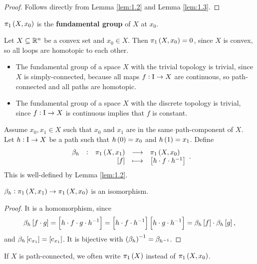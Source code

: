 \begin{proof}
Follows directly from Lemma \ref{lem:1.2} and Lemma \ref{lem:1.3}.
\end{proof}

\begin{definition*}
$ \pi_1\br{X, x_0} $ is the \textbf{fundamental group} of $ X $ at $ x_0 $.
\end{definition*}

\begin{example*}
Let $ X \subseteq \mathbb{R}^n $ be a convex set and $ x_0 \in X $. Then $ \pi_1\br{X, x_0} = 0 $, since $ X $ is convex, so all loops are homotopic to each other.
\end{example*}

\pagebreak

\begin{example*}
\hfill
\begin{itemize}
\item The fundamental group of a space $ X $ with the trivial topology is trivial, since $ X $ is simply-connected, because all maps $ f : \mathrm{I} \to X $ are continuous, so path-connected and all paths are homotopic.
\item The fundamental group of a space $ X $ with the discrete topology is trivial, since $ f : \mathrm{I} \to X $ is continuous implies that $ f $ is constant.
\end{itemize}
\end{example*}

Assume $ x_0, x_1 \in X $ such that $ x_0 $ and $ x_1 $ are in the same path-component of $ X $. Let $ h : \mathrm{I} \to X $ be a path such that $ h\br{0} = x_0 $ and $ h\br{1} = x_1 $. Define
$$ \function[\beta_h]{\pi_1\br{X, x_1}}{\pi_1\br{X, x_0}}{\sbr{f}}{\sbr{h \cdot f \cdot h^{-1}}}. $$
This is well-defined by Lemma \ref{lem:1.2}.

\begin{proposition}
$ \beta_h : \pi_1\br{X, x_1} \to \pi_1\br{X, x_0} $ is an isomorphism.
\end{proposition}

\begin{proof}
It is a homomorphism, since
$$ \beta_h\sbr{f \cdot g} = \sbr{h \cdot f \cdot g \cdot h^{-1}} = \sbr{h \cdot f \cdot h^{-1}}\sbr{h \cdot g \cdot h^{-1}} = \beta_h\sbr{f} \cdot \beta_h\sbr{g}, $$
and $ \beta_h\sbr{\c_{x_1}} = \sbr{\c_{x_1}} $. It is bijective with $ \br{\beta_h}^{-1} = \beta_{h^{-1}} $.
\end{proof}

If $ X $ is path-connected, we often write $ \pi_1\br{X} $ instead of $ \pi_1\br{X, x_0} $.

